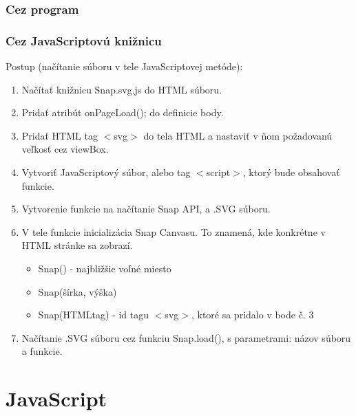  \subsubsection{Cez program}
 
 \subsubsection{Cez JavaScriptovú knižnicu}

Postup (načítanie súboru v tele JavaScriptovej metóde): 
\begin{enumerate}
	\item Načítať knižnicu Snap.svg.js do HTML súboru. 
	\item Pridať atribút onPageLoad(); do definicie body.
	\item Pridať HTML tag $<$svg$>$ do tela HTML a nastaviť v ňom požadovanú veľkosť cez viewBox.
	\item Vytvoriť JavaScriptový súbor, alebo tag $<$script$>$, ktorý bude obsahovať funkcie. 
	\item Vytvorenie funkcie na načítanie Snap API, a .SVG súboru. 
	\item V tele funkcie inicializácia Snap Canvasu. To znamená, kde konkrétne v HTML stránke sa zobrazí.
	\begin{itemize}
		\item Snap() - najbližšie voľné miesto
		\item Snap(šírka, výška) 
		\item Snap(HTMLtag) - id tagu $<$svg$>$, ktoré sa pridalo v bode č. 3
	\end{itemize}
	\item Načítanie .SVG súboru cez funkciu Snap.load(), s parametrami: názov súboru a funkcie. 
	
	
	
\end{enumerate}













\section{JavaScript}











